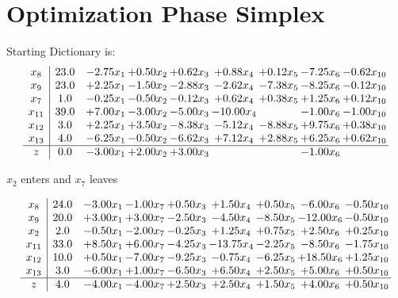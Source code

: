 \documentclass[9pt]{article}
\begin{document}
\section{Optimization Phase Simplex}
Starting Dictionary is:
\[\begin{array}{c| c c@{\hskip 2pt} c@{\hskip 2pt} c@{\hskip 2pt} c@{\hskip 2pt} c@{\hskip 2pt} c@{\hskip 2pt} c@{\hskip 2pt} }
 x_{8}   &  23.0 & -2.75 x_{1} & +  0.50 x_{2} & +  0.62 x_{3} & +  0.88 x_{4} & +  0.12 x_{5} & -7.25 x_{6} & -0.62 x_{10}\\
 x_{9}   &  23.0 & +  2.25 x_{1} & -1.50 x_{2} & -2.88 x_{3} & -2.62 x_{4} & -7.38 x_{5} & -8.25 x_{6} & -0.12 x_{10}\\
 x_{7}   &  1.0 & -0.25 x_{1} & -0.50 x_{2} & -0.12 x_{3} & +  0.62 x_{4} & +  0.38 x_{5} & +  1.25 x_{6} & +  0.12 x_{10}\\
 x_{11}   &  39.0 & +  7.00 x_{1} & -3.00 x_{2} & -5.00 x_{3} & -10.00 x_{4} &   & -1.00 x_{6} & -1.00 x_{10}\\
 x_{12}   &  3.0 & +  2.25 x_{1} & +  3.50 x_{2} & -8.38 x_{3} & -5.12 x_{4} & -8.88 x_{5} & +  9.75 x_{6} & +  0.38 x_{10}\\
 x_{13}   &  4.0 & -6.25 x_{1} & -0.50 x_{2} & -6.62 x_{3} & +  7.12 x_{4} & +  2.88 x_{5} & +  6.25 x_{6} & +  0.62 x_{10}\\
\hline
z    &  0.0 & -3.00 x_{1} & +  2.00 x_{2} & +  3.00 x_{3} &    &   & -1.00 x_{6} &   \\
\end{array}\]


 $ x_{2} $ enters and $ x_{7} $ leaves 

 \[\begin{array}{c| c c@{\hskip 2pt} c@{\hskip 2pt} c@{\hskip 2pt} c@{\hskip 2pt} c@{\hskip 2pt} c@{\hskip 2pt} c@{\hskip 2pt} }
 x_{8}   &  24.0 & -3.00 x_{1} & -1.00 x_{7} & +  0.50 x_{3} & +  1.50 x_{4} & +  0.50 x_{5} & -6.00 x_{6} & -0.50 x_{10}\\
 x_{9}   &  20.0 & +  3.00 x_{1} & +  3.00 x_{7} & -2.50 x_{3} & -4.50 x_{4} & -8.50 x_{5} & -12.00 x_{6} & -0.50 x_{10}\\
 x_{2}   &  2.0 & -0.50 x_{1} & -2.00 x_{7} & -0.25 x_{3} & +  1.25 x_{4} & +  0.75 x_{5} & +  2.50 x_{6} & +  0.25 x_{10}\\
 x_{11}   &  33.0 & +  8.50 x_{1} & +  6.00 x_{7} & -4.25 x_{3} & -13.75 x_{4} & -2.25 x_{5} & -8.50 x_{6} & -1.75 x_{10}\\
 x_{12}   &  10.0 & +  0.50 x_{1} & -7.00 x_{7} & -9.25 x_{3} & -0.75 x_{4} & -6.25 x_{5} & + 18.50 x_{6} & +  1.25 x_{10}\\
 x_{13}   &  3.0 & -6.00 x_{1} & +  1.00 x_{7} & -6.50 x_{3} & +  6.50 x_{4} & +  2.50 x_{5} & +  5.00 x_{6} & +  0.50 x_{10}\\
\hline
z    &  4.0 & -4.00 x_{1} & -4.00 x_{7} & +  2.50 x_{3} & +  2.50 x_{4} & +  1.50 x_{5} & +  4.00 x_{6} & +  0.50 x_{10}\\
\end{array}\]
\end{document}
